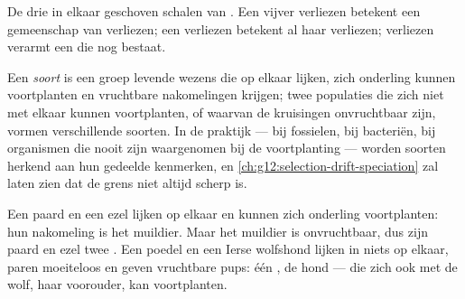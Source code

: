 \begin{omfigure}

{\small De drie in elkaar geschoven schalen van . Een
vijver verliezen betekent een gemeenschap van  verliezen; een
 verliezen betekent al haar  verliezen;  verliezen
verarmt een  die nog bestaat.}
\end{omfigure}

\begin{definition}[Soort]\label{def:g10:biodiversity-scales:species}
Een \emph{soort} is een groep levende wezens die op elkaar lijken, zich
onderling kunnen voortplanten en vruchtbare nakomelingen krijgen; twee
populaties die zich niet met elkaar kunnen voortplanten, of waarvan de
kruisingen onvruchtbaar zijn, vormen verschillende soorten. In de
praktijk --- bij fossielen, bij bacteriën, bij organismen die nooit zijn
waargenomen bij de voortplanting --- worden soorten herkend aan hun
gedeelde kenmerken, en
\cref{ch:g12:selection-drift-speciation} zal laten zien dat de grens
niet altijd scherp is.
\end{definition}

\begin{example}\label{ex:g10:biodiversity-scales:mule}
Een paard en een ezel lijken op elkaar en kunnen zich onderling
voortplanten: hun nakomeling is het muildier. Maar het muildier is
onvruchtbaar, dus zijn paard en ezel twee . Een poedel en een
Ierse wolfshond lijken in niets op elkaar, paren moeiteloos en geven
vruchtbare pups: één , de hond --- die zich ook met de wolf, haar
voorouder, kan voortplanten.
\end{example}


